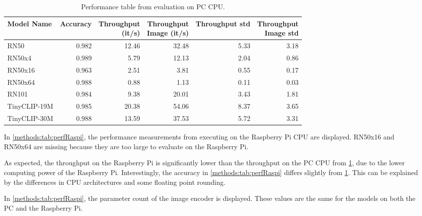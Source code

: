 \begin{table}[tbp]
    \centering
    \begin{tabular}{l|rrrrr}
    \hline
        Model Name & Accuracy & \makecell{Throughput\\(it/s)} & \makecell{Throughput \\ Image (it/s)} & Throughput std & \makecell{Throughput\\Image std} \\ \hline
        RN50 & 0.982 & 12.46 & 32.48 & 5.33 & 3.18 \\ 
        RN50x4 & 0.989 & 5.79 & 12.13 & 2.04 & 0.86 \\ 
        RN50x16 & 0.963 & 2.51 & 3.81 & 0.55 & 0.17 \\ 
        RN50x64 & 0.988 & 0.88 & 1.13 & 0.11 & 0.03 \\
        RN101 & 0.984 & 9.38 & 20.01 & 3.43 & 1.81 \\  
        TinyCLIP-19M & 0.985 & 20.38 & 54.06 & 8.37 & 3.65 \\ 
        TinyCLIP-30M & 0.988 & 13.59 & 37.53 & 5.72 & 3.31 \\ 
    \end{tabular}
    \caption{Performance table from evaluation on PC CPU.}
    \label{methods:tab:perfPC}
\end{table}

In \cref{methods:tab:perfRaspi}, the performance measurements from executing on the Raspberry Pi CPU are displayed. RN50x16 and RN50x64 are missing because they are too large to evaluate on the Raspberry Pi.

As expected, the throughput on the Raspberry Pi is significantly lower than the throughput on the PC CPU from \cref{methods:tab:perfPC}, due to the lower computing power of the Raspberry Pi. Interestingly, the accuracy in \cref{methods:tab:perfRaspi} differs slightly from \cref{methods:tab:perfPC}. This can be explained by the differences in CPU architectures and some floating point rounding.

In \cref{methods:tab:perfRaspi}, the parameter count of the image encoder is displayed. These values are the same for the models on both the PC and the Raspberry Pi.


